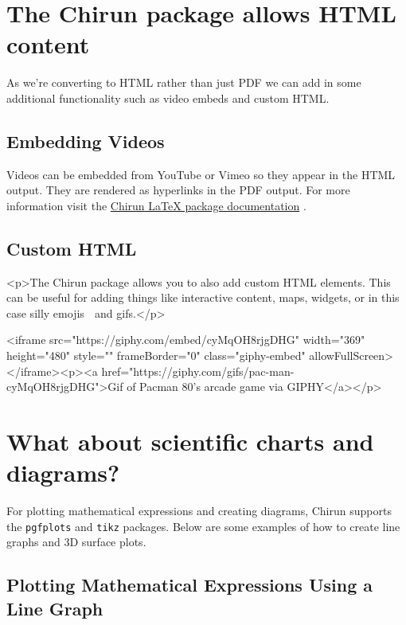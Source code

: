 \documentclass{article} %
\begin{document}
\section{The Chirun package allows HTML content}
As we're converting to HTML rather than just PDF we can add in some additional functionality such as video embeds and custom HTML.

\subsection{Embedding Videos}
Videos can be embedded from YouTube or Vimeo so they appear in the HTML output. They are rendered as hyperlinks in the PDF output. For more information visit the \href{https://chirun.org.uk/docs/en/latest/reference/latex/chirun_package.html}{Chirun LaTeX package documentation} \citep{chirunTutorial}.

\subsection{Custom HTML}
\begin{HTML}
<p>The Chirun package allows you to also add custom HTML elements. This can be useful for adding things like interactive content, maps, widgets, or in this case silly emojis 👾 and gifs.</p>

    <iframe src="https://giphy.com/embed/cyMqOH8rjgDHG" width="369" height="480" style="" frameBorder="0" class="giphy-embed" allowFullScreen></iframe><p><a href="https://giphy.com/gifs/pac-man-cyMqOH8rjgDHG">Gif of Pacman 80's arcade game via GIPHY</a></p>
\end{HTML}

\section{What about scientific charts and diagrams?}
For plotting mathematical expressions and creating diagrams, Chirun supports the \verb|pgfplots| and \verb|tikz| packages. Below are some examples of how to create line graphs and 3D surface plots.

\subsection{Plotting Mathematical Expressions Using a Line Graph}
\end{document}
